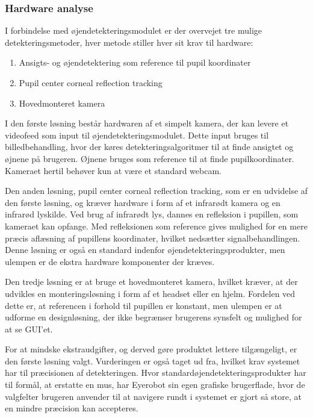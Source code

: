 \subsubsection{Hardware analyse}
I forbindelse med øjendetekteringsmodulet er der overvejet tre mulige detekteringsmetoder, hver metode stiller hver sit krav til hardware:

\begin{enumerate}
	\item Ansigts- og øjendetektering som reference til pupil koordinater 
	\item Pupil center corneal reflection tracking 
	\item Hovedmonteret kamera
\end{enumerate}

I den første løsning består hardwaren af et simpelt kamera, der kan levere et videofeed som input til øjendetekteringsmodulet. 
Dette input bruges til billedbehandling, hvor der køres detekteringsalgoritmer til at finde ansigtet og øjnene på brugeren. 
Øjnene bruges som reference til at finde pupilkoordinater.
Kameraet hertil behøver kun at være et standard webcam.

Den anden løsning, pupil center corneal reflection tracking, som er en udvidelse af den første løsning, og kræver hardware i form af et infrarødt kamera og en infrarød lyskilde. 
Ved brug af infrarødt lys, dannes en refleksion i pupillen, som kameraet kan opfange. 
Med refleksionen som reference gives mulighed for en mere præcis aflæsning af pupillens koordinater, hvilket nedsætter signalbehandlingen. 
Denne løsning er også en standard indenfor øjendetekteringsprodukter, men ulempen er de ekstra hardware komponenter der kræves.

Den tredje løsning er at bruge et hovedmonteret kamera, hvilket kræver, at der udvikles en monteringsløsning i form af et headset eller en hjelm. 
Fordelen ved dette er, at referencen i forhold til pupillen er konstant, men ulempen er at udforme en designløsning, der ikke begrænser brugerens synsfelt og mulighed for at se GUI'et.

For at mindske ekstraudgifter, og derved gøre produktet lettere tilgængeligt, er den første løsning valgt. 
Vurderingen er også taget ud fra, hvilket krav systemet har til præcisionen af detekteringen.
Hvor standardøjendetekteringsprodukter har til formål, at erstatte en mus, har Eyerobot sin egen grafiske brugerflade, hvor de valgfelter brugeren anvender til at navigere rundt i systemet er gjort så store, at en mindre præcision kan accepteres.



